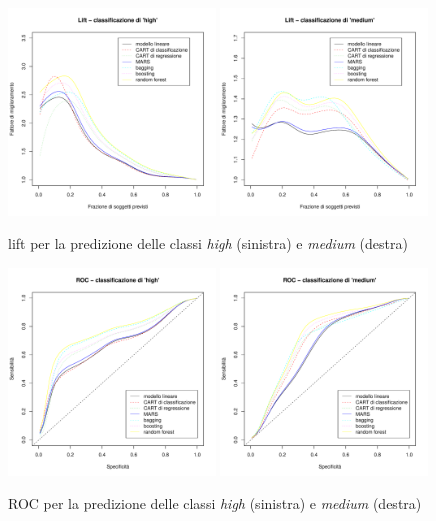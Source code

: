 \documentclass[a4paper, 10pt]{report}
\begin{document}
\begin{figure}
  \centering
  \includegraphics[width=0.49\textwidth]{../plots/lift-high.pdf}
  \includegraphics[width=0.49\textwidth]{../plots/lift-medium.pdf}
  \caption{lift per la predizione delle classi \emph{high} (sinistra) e \emph{medium} (destra)}
  \label{fig:lift}
\end{figure}

\begin{figure}
  \centering
  \includegraphics[width=0.49\textwidth]{../plots/roc-high.pdf}
  \includegraphics[width=0.49\textwidth]{../plots/roc-medium.pdf}
  \caption{ROC per la predizione delle classi \emph{high} (sinistra) e \emph{medium} (destra)}
  \label{fig:roc}
\end{figure}
\end{document}

